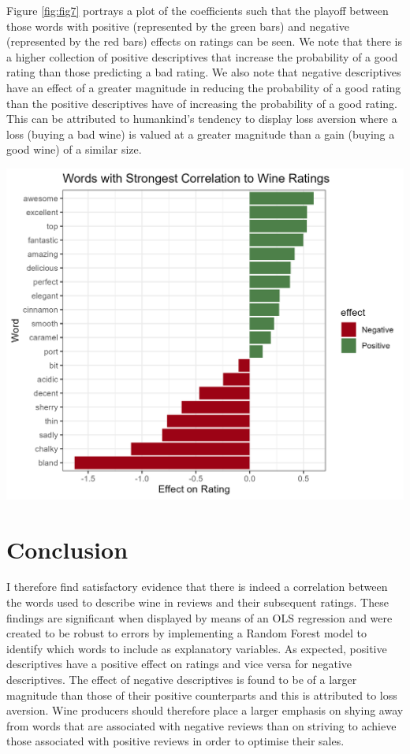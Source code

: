 \documentclass[11pt,preprint]{elsarticle}
\let\origfigure\figure
\let\endorigfigure\endfigure
\renewenvironment{figure}[1][2] {
    \expandafter\origfigure\expandafter[H]
} {
    \endorigfigure
}
\numberwithin{equation}{section}
\numberwithin{figure}{section}
\numberwithin{table}{section}
\begin{document}
Figure \ref{fig:fig7} portrays a plot of the coefficients such that the
playoff between those words with positive (represented by the green
bars) and negative (represented by the red bars) effects on ratings can
be seen. We note that there is a higher collection of positive
descriptives that increase the probability of a good rating than those
predicting a bad rating. We also note that negative descriptives have an
effect of a greater magnitude in reducing the probability of a good
rating than the positive descriptives have of increasing the probability
of a good rating. This can be attributed to humankind's tendency to
display loss aversion where a loss (buying a bad wine) is valued at a
greater magnitude than a gain (buying a good wine) of a similar size.

\begin{figure}[H]

{\centering \includegraphics[width=0.8\linewidth]{writeup/fig7} 

}

\caption{Plot of coefficients on OLS regression of top 20 words in reviews identified by RandomForest model\label{fig:fig7}}\label{fig:fig7}
\end{figure}

\newpage

\section{Conclusion}\label{conclusion}

\label{Concl} I therefore find satisfactory evidence that there is
indeed a correlation between the words used to describe wine in reviews
and their subsequent ratings. These findings are significant when
displayed by means of an OLS regression and were created to be robust to
errors by implementing a Random Forest model to identify which words to
include as explanatory variables. As expected, positive descriptives
have a positive effect on ratings and vice versa for negative
descriptives. The effect of negative descriptives is found to be of a
larger magnitude than those of their positive counterparts and this is
attributed to loss aversion. Wine producers should therefore place a
larger emphasis on shying away from words that are associated with
negative reviews than on striving to achieve those associated with
positive reviews in order to optimise their sales.
\end{document}
